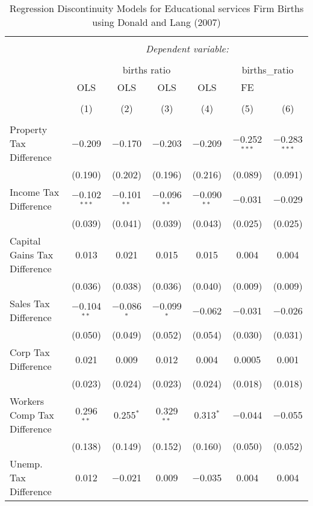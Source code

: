
\begin{table}[!htbp] \centering 
  \caption{Regression Discontinuity Models for  Educational services Firm Births using Donald and Lang (2007)} 
  \label{} 
\begin{tabular}{@{\extracolsep{5pt}}lcccccc} 
\\[-1.8ex]\hline 
\hline \\[-1.8ex] 
 & \multicolumn{6}{c}{\textit{Dependent variable:}} \\ 
\cline{2-7} 
\\[-1.8ex] & \multicolumn{4}{c}{births ratio} & \multicolumn{2}{c}{births\_ratio} \\ 
 & OLS & OLS & OLS & OLS & FE &  \\ 
\\[-1.8ex] & (1) & (2) & (3) & (4) & (5) & (6)\\ 
\hline \\[-1.8ex] 
 Property Tax Difference & $-$0.209 & $-$0.170 & $-$0.203 & $-$0.209 & $-$0.252$^{***}$ & $-$0.283$^{***}$ \\ 
  & (0.190) & (0.202) & (0.196) & (0.216) & (0.089) & (0.091) \\ 
  Income Tax Difference & $-$0.102$^{***}$ & $-$0.101$^{**}$ & $-$0.096$^{**}$ & $-$0.090$^{**}$ & $-$0.031 & $-$0.029 \\ 
  & (0.039) & (0.041) & (0.039) & (0.043) & (0.025) & (0.025) \\ 
  Capital Gains Tax Difference & 0.013 & 0.021 & 0.015 & 0.015 & 0.004 & 0.004 \\ 
  & (0.036) & (0.038) & (0.036) & (0.040) & (0.009) & (0.009) \\ 
  Sales Tax Difference & $-$0.104$^{**}$ & $-$0.086$^{*}$ & $-$0.099$^{*}$ & $-$0.062 & $-$0.031 & $-$0.026 \\ 
  & (0.050) & (0.049) & (0.052) & (0.054) & (0.030) & (0.031) \\ 
  Corp Tax Difference & 0.021 & 0.009 & 0.012 & 0.004 & 0.0005 & 0.001 \\ 
  & (0.023) & (0.024) & (0.023) & (0.024) & (0.018) & (0.018) \\ 
  Workers Comp Tax Difference & 0.296$^{**}$ & 0.255$^{*}$ & 0.329$^{**}$ & 0.313$^{*}$ & $-$0.044 & $-$0.055 \\ 
  & (0.138) & (0.149) & (0.152) & (0.160) & (0.050) & (0.052) \\ 
  Unemp. Tax Difference & 0.012 & $-$0.021 & 0.009 & $-$0.035 & 0.004 & 0.004 \\ 

\end{tabular}
\end{table}
